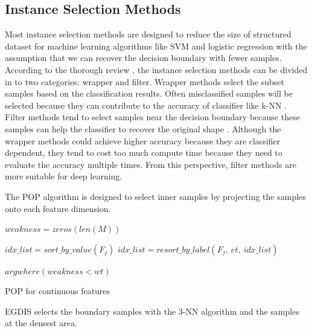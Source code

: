 \subsection{Instance Selection Methods}
Most instance selection methods are designed to reduce the size of structured dataset for machine learning algorithms like SVM and logistic regression with the assumption that we can recover the decision boundary with fewer samples. According to the thorough review \cite{Olvera-Lopez2010}, the instance selection methods can be divided in to two categories: wrapper and filter. Wrapper methods select the subset samples based on the classification results. Often misclassified samples will be selected because they can contribute to the accuracy of classifier like k-NN \cite{Aha1991}. Filter methods tend to  select samples near the decision boundary because these samples can help the classifier to recover the original shape \cite{Riquelme2003a}. Although the wrapper methods could achieve higher accuracy because they are classifier dependent, they tend to cost too much compute time because they need to evaluate the accuracy multiple times. From this perspective, filter methods are more suitable for deep learning.

The POP algorithm is designed to select inner samples by projecting the samples onto each feature dimension.

\begin{algorithm}[H]
\label{pop_psudo}
 

$weakness = zeros(len(M))$ \;

 {
	 $idx\_list = sort\_by\_value(F_j)$ \;
	 $idx\_list = resort\_by\_label(F_j,\ et,\ idx\_list)$ \;
	 
	  {
	 }
}

\Return $argwhere(weakness < wt)$ \;

\caption{POP for continuous features}
\end{algorithm}

EGDIS selects the boundary samples with the 3-NN algorithm and the samples at the densest area.


